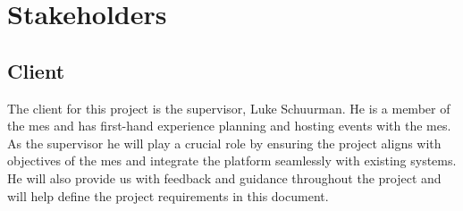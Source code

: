 \documentclass[12pt]{article}
\newcommand{\lips}{\textit{Insert your content here.}}
\begin{document}
\section{Stakeholders}
\subsection{Client}
The client for this project is the supervisor, Luke Schuurman. He is a member of the \gls{mes} and has first-hand
experience planning and hosting events with the \gls{mes}. As the supervisor he will play a crucial role by ensuring the
project aligns with objectives of the \gls{mes} and integrate the platform seamlessly with existing systems. He will also
provide us with feedback and guidance throughout the project and will help define the project requirements in this
document.
\end{document}
